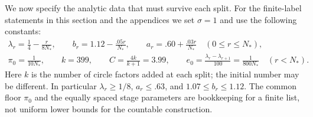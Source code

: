 \documentclass[11pt]{article}
\numberwithin{equation}{section}
\theoremstyle{definition}
\theoremstyle{remark}
\begin{document}
We now specify the analytic data that must survive each split.
For the finite-label statements in this section and the appendices we set $\sigma=1$
and use the following constants:
\begin{equation}\label{packet:constants}
\begin{gathered}
 \lambda_r=\frac14-\frac{r}{8N_*},\qquad
 b_r=1.12-\frac{.05r}{N_*},\qquad
 a_r=.60+\frac{.03r}{N_*}\quad(0\le r\le N_*),\\
 \pi_0=\frac{1}{10N_*},\qquad k=399,\qquad
 C=\frac{4k}{k+1}=3.99,\qquad
 e_0=\frac{\lambda_r-\lambda_{r+1}}{100}
     =\frac{1}{800N_*}\quad(r<N_*).
\end{gathered}
\end{equation}
Here $k$ is the number of circle factors added at each split; the initial
number may be different.  In particular $\lambda_r\ge1/8$, $a_r\le.63$,
and $1.07\le b_r\le1.12$.  The common floor $\pi_0$ and the equally
spaced stage parameters are bookkeeping for a finite list, not uniform
lower bounds for the countable construction.
\end{document}
